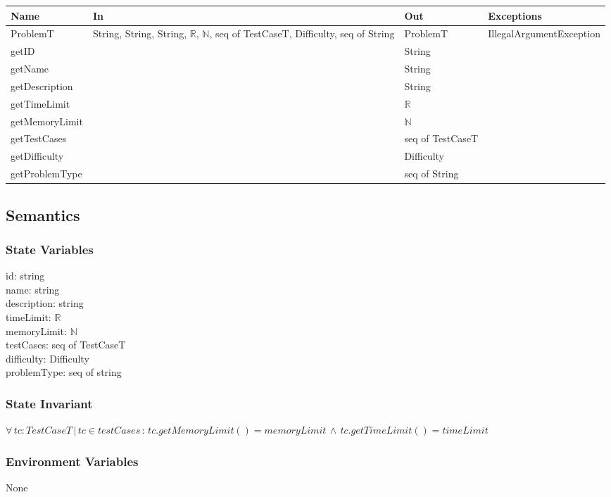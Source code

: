 \documentclass[12pt, titlepage]{article}
\begin{document}
\begin{center}
\begin{tabular}{ |  p{4cm} | p{3cm} |  p{3cm} | p{5cm} | }
\hline
\textbf{Name} & \textbf{In} & \textbf{Out} & \textbf{Exceptions} \\
\hline
ProblemT & String, String, String, $\mathbb{R}$, $\mathbb{N}$, seq of TestCaseT, Difficulty, seq of String  & ProblemT  & IllegalArgumentException \\
getID & & String & \\
getName & & String & \\
getDescription & & String & \\
getTimeLimit & & $\mathbb{R}$  & \\
getMemoryLimit & & $\mathbb{N}$ & \\
getTestCases & & seq of TestCaseT & \\
getDifficulty & & Difficulty & \\
getProblemType & & seq of String & \\

\hline
\end{tabular}
\end{center}

\subsection{Semantics}

\subsubsection{State Variables}

id: string\\
name: string\\
description: string\\
timeLimit: $\mathbb{R}$\\
memoryLimit: $\mathbb{N}$\\
testCases: seq of TestCaseT\\
difficulty: Difficulty\\
problemType: seq of string

\subsubsection{State Invariant}
$\forall \, tc : TestCaseT \,|\,  tc \in testCases \,:\, tc.getMemoryLimit() = memoryLimit \, \land \, tc.getTimeLimit() = timeLimit$

\subsubsection{Environment Variables}
None
\end{document}
